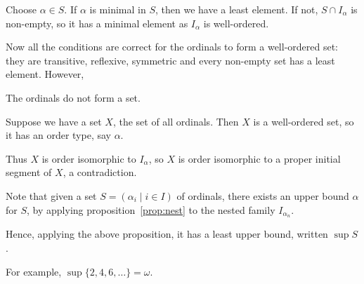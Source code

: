 \documentclass[12pt]{article}
\begin{document}
\begin{proofbox}
	Choose $\alpha \in S$. If $\alpha$ is minimal in $S$, then we have a least element. If not, $S \cap I_{\alpha}$ is non-empty, so it has a minimal element as $I_{\alpha}$ is well-ordered.
\end{proofbox}

Now all the conditions are correct for the ordinals to form a well-ordered set: they are transitive, reflexive, symmetric and every non-empty set has a least element. However,

\begin{theorem}
	The ordinals do not form a set.
\end{theorem}

\begin{proofbox}
	Suppose we have a set $X$, the set of all ordinals. Then $X$ is a well-ordered set, so it has an order type, say $\alpha$.

	Thus $X$ is order isomorphic to $I_{\alpha}$, so $X$ is order isomorphic to a proper initial segment of $X$, a contradiction.
\end{proofbox}

Note that given a set $S = (\alpha_i \mid i \in I)$ of ordinals, there exists an upper bound $\alpha$ for $S$, by applying proposition~\ref{prop:nest} to the nested family $I_{\alpha_n}$.

Hence, applying the above proposition, it has a least upper bound, written $\sup S$.

For example, $\sup \{2, 4, 6, \dots\} = \omega$.
\end{document}
